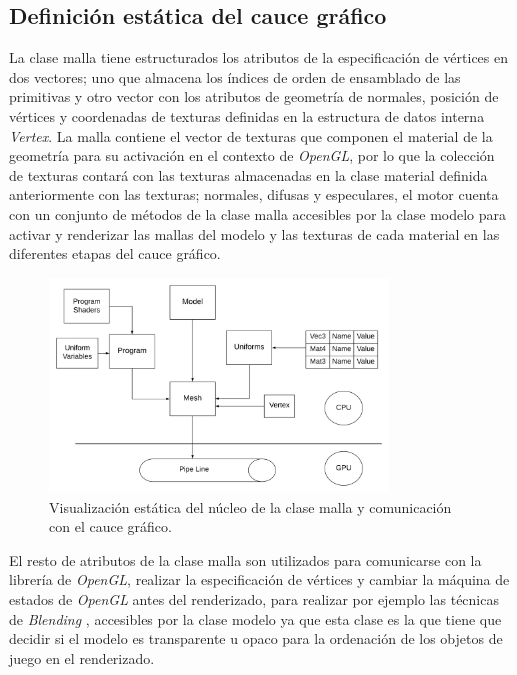 \documentclass[a4paper]{book}
\begin{document}
\subsection{Definición estática del cauce gráfico}

La clase malla tiene estructurados los atributos de la especificación de vértices en dos vectores; uno que almacena los índices de
orden de ensamblado de las primitivas y otro vector con los atributos de geometría de normales, posición de vértices y coordenadas de texturas
definidas en la estructura de datos interna \textit{Vertex}. La malla contiene el vector de texturas que componen el material de la geometría para su
activación en el contexto de \textit{OpenGL}, por lo que la colección de texturas contará con las texturas almacenadas en la clase material definida 
anteriormente con las texturas; normales, difusas y especulares, el motor cuenta con un conjunto de métodos de la clase malla accesibles por la clase
modelo para activar y renderizar las mallas del modelo y las texturas de cada material en las diferentes etapas del cauce gráfico.

\begin{figure}[H]
    \centering
    \includegraphics[width=9cm, keepaspectratio]{img/StaticPipe.png}
    \caption{Visualización estática del núcleo de la clase malla y comunicación con el cauce gráfico.}
    \label{custom_textures}
\end{figure}

El resto de atributos de la clase malla son utilizados para comunicarse con la librería de \textit{OpenGL}, realizar la especificación de
vértices y cambiar la máquina de estados de \textit{OpenGL} antes del renderizado, para realizar por ejemplo las técnicas de 
\textit{Blending} \cite{article:_transparnet_shadows}, accesibles por la clase modelo ya que esta clase es la que tiene que decidir si el modelo
es transparente u opaco para la ordenación de los objetos de juego en el renderizado.
\end{document}
